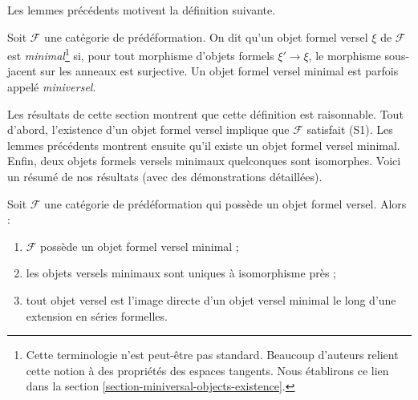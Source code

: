 \noindent
Les lemmes précédents motivent la définition suivante.

\begin{definition}
\label{definition-minimal-versal}
Soit $\mathcal{F}$ une catégorie de prédéformation. On dit qu'un objet formel
versel $\xi$ de $\mathcal{F}$ est {\it minimal}\footnote{Cette terminologie
n'est peut-être pas standard. Beaucoup d'auteurs relient cette notion à des
propriétés des espaces tangents. Nous établirons ce lien dans la section
\ref{section-miniversal-objects-existence}.} si, pour tout morphisme d'objets
formels $\xi' \to \xi$, le morphisme sous-jacent sur les anneaux est
surjective. Un objet formel versel minimal est parfois appelé {\it miniversel}.
\end{definition}

\noindent
Les résultats de cette section montrent que cette définition est raisonnable.
Tout d'abord, l'existence d'un objet formel versel implique que
$\mathcal{F}$ satisfait (S1). Les lemmes précédents montrent ensuite qu'il
existe un objet formel versel minimal. Enfin, deux objets formels versels
minimaux quelconques sont isomorphes. Voici un résumé de nos résultats (avec
des démonstrations détaillées).

\begin{lemma}
\label{lemma-minimal-versal}
Soit $\mathcal{F}$ une catégorie de prédéformation qui possède un objet
formel versel. Alors :
\begin{enumerate}
\item $\mathcal{F}$ possède un objet formel versel minimal ;
\item les objets versels minimaux sont uniques à isomorphisme près ;
\item tout objet versel est l'image directe d'un objet versel minimal le long
d'une extension en séries formelles.
\end{enumerate}
\end{lemma}

